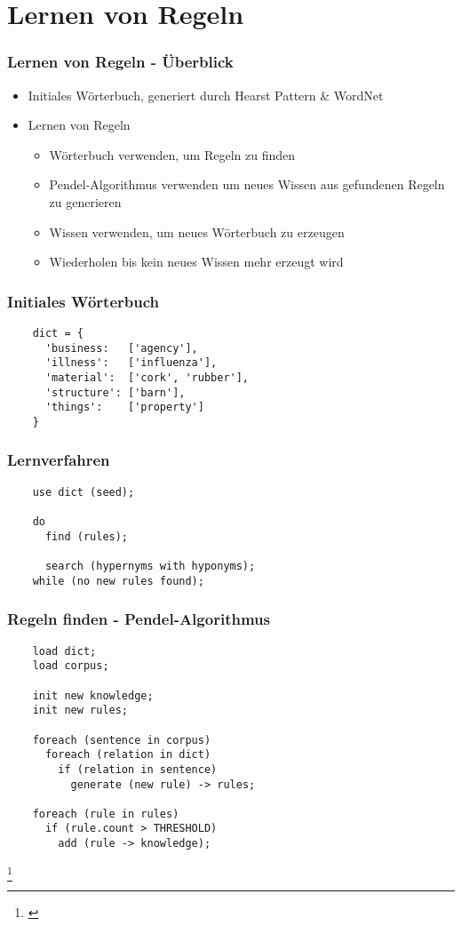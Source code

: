 \section{Lernen von Regeln}
\label{sec:iteratives-lernen}

\begin{frame}
  \frametitle{Lernen von Regeln - Überblick}

  \begin{itemize}
  \item Initiales Wörterbuch, generiert durch Hearst Pattern \& WordNet
  \item Lernen von Regeln
    \begin{itemize}
    \item Wörterbuch verwenden, um Regeln zu finden
    \item Pendel-Algorithmus verwenden um neues Wissen aus gefundenen
      Regeln zu generieren \cite{Biemann:2003}
    \item Wissen verwenden, um neues Wörterbuch zu erzeugen
    \item Wiederholen bis kein neues Wissen mehr erzeugt wird
    \end{itemize}
  \end{itemize}
\end{frame}

\begin{frame}[fragile]
  \frametitle{Initiales Wörterbuch}

  \begin{lstlisting}
    dict = {
      'business:   ['agency'],
      'illness':   ['influenza'],
      'material':  ['cork', 'rubber'],
      'structure': ['barn'],
      'things':    ['property']
    }
  \end{lstlisting}
\end{frame}

\begin{frame}[fragile]
  \frametitle{Lernverfahren}

  \begin{lstlisting}
    use dict (seed);

    do
      find (rules);

      search (hypernyms with hyponyms);
    while (no new rules found);
  \end{lstlisting}
\end{frame}

\begin{frame}[fragile]
  \frametitle{Regeln finden - Pendel-Algorithmus}

  \begin{lstlisting}
    load dict;
    load corpus;
    
    init new knowledge;
    init new rules;

    foreach (sentence in corpus)
      foreach (relation in dict)
        if (relation in sentence)
          generate (new rule) -> rules;

    foreach (rule in rules)
      if (rule.count > THRESHOLD)
        add (rule -> knowledge);
  \end{lstlisting}

  \let\thefootnote\relax\footnote{\cite{Biemann:2003}}
\end{frame}

